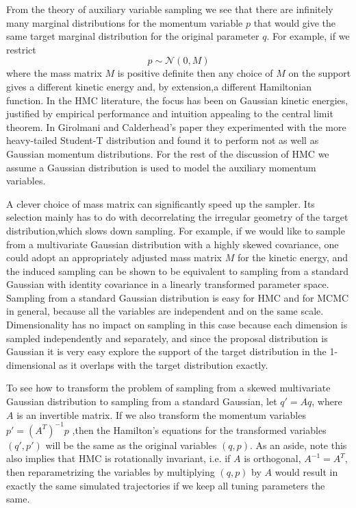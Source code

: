 \documentclass[]{report}
\begin{document}
From the theory of auxiliary variable sampling we see that there are infinitely
many marginal distributions for the momentum variable $p$ that would give the
same target marginal distribution for the original parameter $q$. For example,
if we restrict 
\[ p \sim \mathcal{N}(0,M) \]
where the mass matrix $M$ is positive definite then any choice of $M$ on the support gives a
different kinetic energy and, by extension,a different Hamiltonian function. In the HMC
literature, the focus has been on Gaussian kinetic energies, 
justified by empirical performance and intuition appealing to the central limit
theorem. In Girolmani and Calderhead's paper \cite{girolami2011riemann} they experimented
with the more heavy-tailed Student-T distribution and found it to perform not as
well
as Gaussian momentum distributions. For the rest of the discussion of HMC we
assume a Gaussian distribution is used to model the auxiliary momentum variables.

A clever choice of mass matrix can significantly speed up the sampler. Its
selection mainly has to do with decorrelating the irregular geometry of the
target distribution,which slows down sampling. For example, if we would like to sample from a multivariate
Gaussian distribution with a highly skewed covariance, one could adopt an
appropriately adjusted mass
matrix $M$ for the kinetic energy, and the induced sampling can be shown to be
equivalent to sampling from a standard Gaussian with identity covariance in a
linearly transformed parameter space. Sampling from a standard Gaussian
distribution is easy
for HMC and for MCMC in general, because all the variables are independent and on
the same scale. Dimensionality has no impact on sampling in this case because
each dimension is sampled independently and separately, and since the proposal
distribution is Gaussian it is very easy explore the support of the target
distribution in the 1-dimensional as it overlaps with the target distribution
exactly. 

To see how to transform the problem of sampling from a skewed multivariate
Gaussian distribution to sampling from a standard Gaussian, let $q' = Aq$, where $A$ is an invertible matrix. If we also
transform the momentum variables $p' = (A^T)^{-1}p$ ,then the
Hamilton's equations for the transformed variables $(q',p')$ will be the same as
the original variables $(q,p)$. As an aside, note this also implies that HMC is rotationally
invariant, i.e. if $A$ is orthogonal, $A^{-1} = A^T$, then reparametrizing the
variables by  multiplying $(q,p)$ by $A$ would result in exactly the same simulated
trajectories if we keep all tuning parameters the same.
\end{document}
